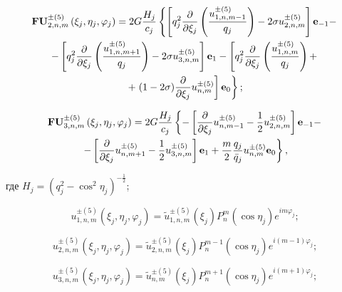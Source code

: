 \begin{russian}
\begin{multline}
{\bf{FU}}_{2,n,m}^{ \pm (5)}\left( {{\xi _j},{\eta _j},{\varphi _j}} \right) = 2G\frac{{{H_j}}}{{{c_j}}}\left\{ {\left[ {q_j^2\frac{\partial }{{\partial {\xi _j}}}\left( {\frac{{u_{1,n,m - 1}^{ \pm (5)}}}{{{q_j}}}} \right) - 2\sigma u_{2,n,m}^{ \pm (5)}} \right]{{\bf{e}}_{ - 1}} - } \right.\\
- \left[ {q_j^2\frac{\partial }{{\partial {\xi _j}}}\left( {\frac{{u_{1,n,m + 1}^{ \pm (5)}}}{{{q_j}}}} \right) - 2\sigma u_{3,n,m}^{ \pm (5)}} \right]{{\bf{e}}_1} - \left[ {q_j^2\frac{\partial }{{\partial {\xi _j}}}\left( {\frac{{u_{1,n,m}^{ \pm (5)}}}{{{q_j}}}} \right) + } \right.\\
\left. { + \left. {(1 - 2\sigma )\frac{\partial }{{\partial {\xi _j}}}u_{n,m}^{ \pm (5)}} \right]{{\bf{e}}_0}} \right\};
\label{eq:9:f2}
\end{multline}

\begin{multline}
{\bf{FU}}_{3,n,m}^{ \pm (5)}\left( {{\xi _j},{\eta _j},{\varphi _j}} \right) = 2G\frac{{{H_j}}}{{{c_j}}}\left\{ { - \left[ {\frac{\partial }{{\partial {\xi _j}}}u_{n,m - 1}^{ \pm (5)} - \frac{1}{2}u_{2,n,m}^{ \pm (5)}} \right]{{\bf{e}}_{ - 1}} - } \right.\\
\left. { - \left[ {\frac{\partial }{{\partial {\xi _j}}}u_{n,m + 1}^{ \pm (5)} - \frac{1}{2}u_{3,n,m}^{ \pm (5)}} \right]{{\bf{e}}_1} + \frac{m}{2}\frac{{{q_j}}}{{{{\bar q}_j}}}u_{n,m}^{ \pm (5)}{{\bf{e}}_0}} \right\},
\label{eq:9:f3}
\end{multline}

\noindent где ${H_j} = {\left( {q_j^2 - {{\cos }^2}{\eta _j}} \right)^{ - \frac{1}{2}}}$;

\begin{equation}
u_{1,n,m}^{ \pm (5)}\left( {{\xi _j},{\eta _j},{\varphi _j}} \right) = \tilde u_{1,n,m}^{ \pm (5)}({\xi _j})P_n^m(\cos {\eta _j}){e^{im{\varphi _j}}};
\end{equation}

\begin{equation}
u_{2,n,m}^{ \pm (5)}\left( {{\xi _j},{\eta _j},{\varphi _j}} \right) = \tilde u_{2,n,m}^{ \pm (5)}({\xi _j})P_n^{m - 1}(\cos {\eta _j}){e^{i(m - 1){\varphi _j}}};
\end{equation}

\begin{equation}
u_{3,n,m}^{ \pm (5)}\left( {{\xi _j},{\eta _j},{\varphi _j}} \right) = \tilde u_{n,m}^{ \pm (5)}({\xi _j})P_n^{m + 1}(\cos {\eta _j}){e^{i(m + 1){\varphi _j}}};
\end{equation}


\end{russian}
